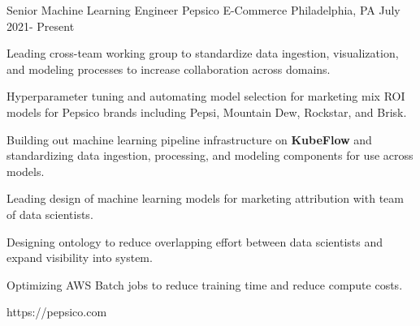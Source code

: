 
\begin{cventries}

\cventrylink
{Senior Machine Learning Engineer}
{Pepsico E-Commerce}
{Philadelphia, PA}
{July 2021- Present}
{
\begin{cvitems}
\item{Leading cross-team working group to standardize data ingestion, visualization, and modeling processes to increase collaboration across domains.}
\item{Hyperparameter tuning and automating model selection for marketing mix ROI models for Pepsico brands including Pepsi, Mountain Dew, Rockstar, and Brisk.}
\item{Building out machine learning pipeline infrastructure on \textbf{KubeFlow} and standardizing data ingestion, processing, and modeling components for use across models.}
\item{Leading design of machine learning models for marketing attribution with team of data scientists.}
\item{Designing ontology to reduce overlapping effort between data scientists and expand visibility into system.}
\item{Optimizing AWS Batch jobs to reduce training time and reduce compute costs.}
\end{cvitems}
}
{https://pepsico.com}




\end{cventries}
